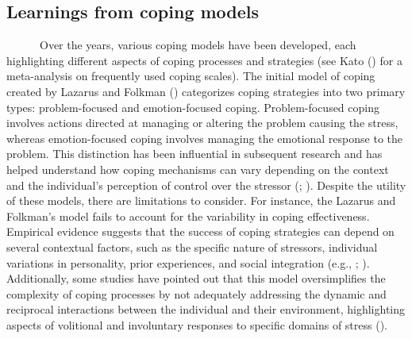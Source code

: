 \documentclass[
  man,floatsintext]{apa7}
\begin{document}
\subsection{Learnings from coping models}\label{learnings-from-coping-models}

~~~~~~Over the years, various coping models have been developed, each highlighting different aspects of coping processes and strategies (see Kato () for a meta-analysis on frequently used coping scales). The initial model of coping created by Lazarus and Folkman () categorizes coping strategies into two primary types: problem-focused and emotion-focused coping. Problem-focused coping involves actions directed at managing or altering the problem causing the stress, whereas emotion-focused coping involves managing the emotional response to the problem. This distinction has been influential in subsequent research and has helped understand how coping mechanisms can vary depending on the context and the individual's perception of control over the stressor (; ). Despite the utility of these models, there are limitations to consider. For instance, the Lazarus and Folkman's model fails to account for the variability in coping effectiveness. Empirical evidence suggests that the success of coping strategies can depend on several contextual factors, such as the specific nature of stressors, individual variations in personality, prior experiences, and social integration (e.g., ; ). Additionally, some studies have pointed out that this model oversimplifies the complexity of coping processes by not adequately addressing the dynamic and reciprocal interactions between the individual and their environment, highlighting aspects of volitional and involuntary responses to specific domains of stress ().
\end{document}
